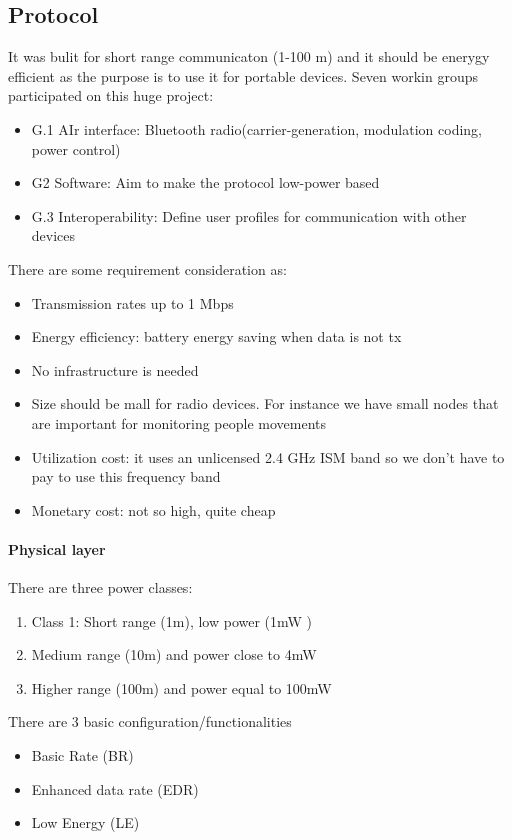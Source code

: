 \subsection{Protocol}
It was bulit for short range communicaton (1-100 m) and it should be enerygy efficient as the purpose is to use it for portable devices. Seven workin groups participated on this huge project:
\begin{itemize}
\item G.1 AIr interface: Bluetooth radio(carrier-generation, modulation coding, power control)
\item G2 Software: Aim to make the protocol low-power based
\item G.3 Interoperability: Define user profiles for communication with other devices
\end{itemize}
There are some requirement consideration as:
\begin{itemize}
\item Transmission rates up to 1 Mbps
\item Energy efficiency: battery energy saving when data is not tx
\item No infrastructure is needed
\item Size should be mall for radio devices. For instance we have small nodes that are important for monitoring people movements
\item Utilization cost: it uses an unlicensed 2.4 GHz ISM band so we don't have to pay to use this frequency band
\item Monetary cost: not so high, quite cheap
\end{itemize}

\paragraph{Physical layer}
There are three power classes:
\begin{enumerate}
\item Class 1: Short range (1m), low power (1mW )
\item Medium range (10m) and power close to 4mW
\item Higher range (100m) and power equal to 100mW
\end{enumerate}
There are 3 basic configuration/functionalities
\begin{itemize}
\item Basic Rate (BR)
\item Enhanced data rate (EDR)
\item Low Energy (LE)
\end{itemize}

